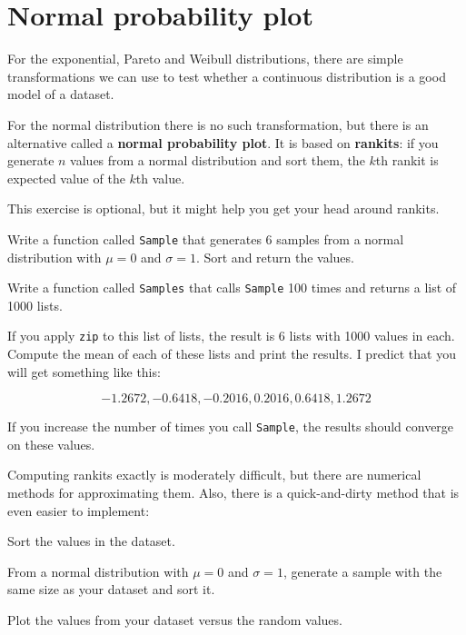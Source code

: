 \documentclass[10pt]{book}
\begin{document}
\section{Normal probability plot}

For the exponential, Pareto and Weibull distributions, there are
simple transformations we can use to test whether a continuous
distribution is a good model of a dataset.

For the normal distribution there is no such transformation, but
there is an alternative called a {\bf normal probability plot}.
It is based on {\bf rankits}: if you generate $n$
values from a normal distribution and sort them,
the $k$th rankit is expected value of the $k$th value.

\begin{ex}
This exercise is optional, but it might help you get your head around rankits.

Write a function called {\tt Sample} that generates 6 samples from a
normal distribution with $\mu = 0$ and $\sigma = 1$.  Sort and return
the values.

Write a function called {\tt Samples} that calls {\tt Sample} 100 times and
returns a list of 1000 lists.

If you apply {\tt zip} to this list of lists, the result is 6 lists
with 1000 values in each.  Compute the mean of each of these lists
and print the results.  I predict that you will get something like
this:

\[ -1.2672,   -0.6418,   -0.2016,   0.2016,   0.6418,   1.2672 \]

If you increase the number of times you call {\tt Sample}, the
results should converge on these values.

\end{ex}


Computing rankits exactly is moderately difficult, but there are
numerical methods for approximating them.  Also, there is a
quick-and-dirty method that is even easier to implement:

\begin{description}

\item Sort the values in the dataset.

\item From a normal distribution with $\mu = 0$ and $\sigma = 1$,
generate a sample with the same size as your dataset and sort it.

\item Plot the values from your dataset versus the random values.

\end{description}
\end{document}
